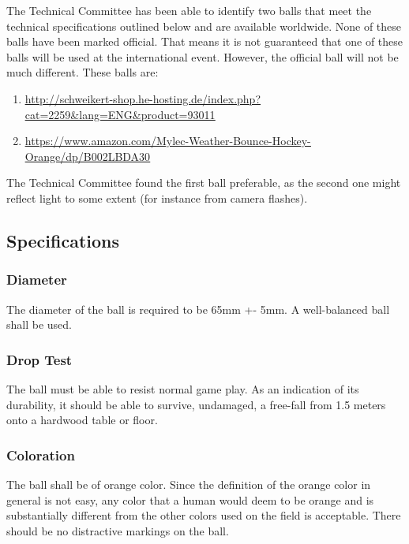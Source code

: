 \documentclass{article}
\begin{document}
The Technical Committee has been able to identify two balls that meet the
technical specifications outlined below and are available worldwide. None of
these balls have been marked official. That means it is not guaranteed that one
of these balls will be used at the international event. However, the official
ball will not be much different. These balls are:

\begin{enumerate}

\item \underline{\href{http://schweikert-shop.he-hosting.de/index.php?cat=2259&lang=ENG&product=93011}{http://schweikert-shop.he-hosting.de/index.php?cat=2259\&lang=ENG\&product=93011}}

\item \underline{\href{https://www.amazon.com/Mylec-Weather-Bounce-Hockey-Orange/dp/B002LBDA30}{https://www.amazon.com/Mylec-Weather-Bounce-Hockey-Orange/dp/B002LBDA30}}

\end{enumerate}

The Technical Committee found the first ball preferable, as the second one
might reflect light to some extent (for instance from camera flashes).

\subsection{Specifications}

\subsubsection{Diameter}

The diameter of the ball is required to be 65mm +- 5mm. A well-balanced ball
shall be used.

\subsubsection{Drop Test}

The ball must be able to resist normal game play. As an indication of its
durability, it should be able to survive, undamaged, a free-fall from 1.5
meters onto a hardwood table or floor.

\subsubsection{Coloration}

The ball shall be of orange color. Since the definition of the orange color in
general is not easy, any color that a human would deem to be orange and is
substantially different from the other colors used on the field is acceptable.
There should be no distractive markings on the ball.
\end{document}
